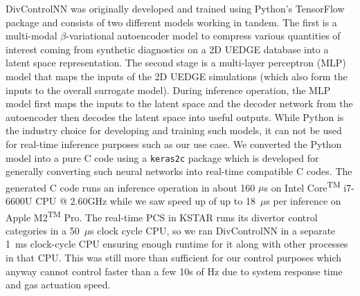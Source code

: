 DivControlNN was originally developed and trained using Python's TensorFlow package and consists of two different models working in tandem.
The first is a multi-modal $\beta$-variational autoencoder \cite{Higgins_2017_ICLR} model to compress various quantities of interest coming from synthetic diagnostics on a 2D UEDGE database into a latent space representation.
The second stage is a multi-layer perceptron (MLP) model that maps the inputs of the 2D UEDGE simulations (which also form the inputs to the overall surrogate model).
During inference operation, the MLP model first maps the inputs to the latent space and the decoder network from the autoencoder then decodes the latent space into useful outputs.
While Python is the industry choice for developing and training such models, it can not be used for real-time inference purposes such as our use case.
We converted the Python model into a pure C code using a \texttt{keras2c} \cite{keras2c} package which is developed for generally converting such neural networks into real-time compatible C codes.
The generated C code runs an inference operation in about 160 $\mu$s on Intel\textsuperscript{\textregistered} Core\textsuperscript{TM} i7-6600U CPU @ 2.60GHz while we saw speed up of up to 18~$\mu$s per inference on Apple\textsuperscript{\textregistered} M2\textsuperscript{TM} Pro.
The real-time PCS in KSTAR runs its divertor control categories in a 50~$\mu$s clock cycle CPU, so we ran DivControlNN in a separate 1~ms clock-cycle CPU ensuring enough runtime for it along with other processes in that CPU.
This was still more than sufficient for our control purposes which anyway cannot control faster than a few 10s of Hz due to system response time and gas actuation speed.

